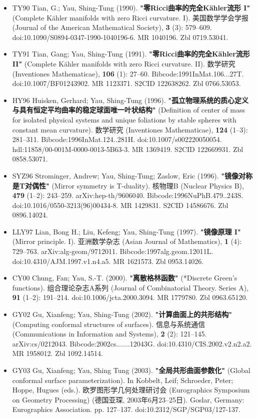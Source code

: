 \begin{itemize}
\item TY90 Tian, G.; Yau, Shing-Tung (1990). \textbf{"零Ricci曲率的完全Kähler流形 I"} (Complete Kähler manifolds with zero Ricci curvature. I). 美国数学学会学报 (Journal of the American Mathematical Society), \textbf{3} (3): 579–609. doi:10.1090/S0894-0347-1990-1040196-6. MR 1040196. Zbl 0719.53041.
\item TY91 Tian, Gang; Yau, Shing-Tung (1991). \textbf{"零Ricci曲率的完全Kähler流形 II"} (Complete Kähler manifolds with zero Ricci curvature. II). 数学研究 (Inventiones Mathematicae), \textbf{106} (1): 27–60. Bibcode:1991InMat.106...27T. doi:10.1007/BF01243902. MR 1123371. S2CID 122638262. Zbl 0766.53053.
\item HY96 Huisken, Gerhard; Yau, Shing-Tung (1996). \textbf{"孤立物理系统的质心定义与具有恒定平均曲率的稳定球面唯一叶状结构"} (Definition of center of mass for isolated physical systems and unique foliations by stable spheres with constant mean curvature). 数学研究 (Inventiones Mathematicae), \textbf{124} (1–3): 281–311. Bibcode:1996InMat.124..281H. doi:10.1007/s002220050054. hdl:11858/00-001M-0000-0013-5B63-3. MR 1369419. S2CID 122669931. Zbl 0858.53071.
\item SYZ96 Strominger, Andrew; Yau, Shing-Tung; Zaslow, Eric (1996). \textbf{"镜像对称是T对偶性"} (Mirror symmetry is T-duality). 核物理B (Nuclear Physics B), \textbf{479} (1–2): 243–259. arXiv:hep-th/9606040. Bibcode:1996NuPhB.479..243S. doi:10.1016/0550-3213(96)00434-8. MR 1429831. S2CID 14586676. Zbl 0896.14024.
\item LLY97 Lian, Bong H.; Liu, Kefeng; Yau, Shing-Tung (1997). \textbf{"镜像原理 I"} (Mirror principle. I). 亚洲数学杂志 (Asian Journal of Mathematics), \textbf{1} (4): 729–763. arXiv:alg-geom/9712011. Bibcode:1997alg.geom.12011L. doi:10.4310/AJM.1997.v1.n4.a5. MR 1621573. Zbl 0953.14026.
\item CY00 Chung, Fan; Yau, S.-T. (2000). \textbf{"离散格林函数"} (*Discrete Green's functions). 组合理论杂志A系列 (Journal of Combinatorial Theory. Series A), \textbf{91} (1–2): 191–214. doi:10.1006/jcta.2000.3094. MR 1779780. Zbl 0963.65120.
\item GY02 Gu, Xianfeng; Yau, Shing-Tung (2002). \textbf{"计算曲面上的共形结构"} (Computing conformal structures of surfaces). 信息与系统通信 (Communications in Information and Systems), \textbf{2} (2): 121–145. arXiv:cs/0212043. Bibcode:2002cs.......12043G. doi:10.4310/CIS.2002.v2.n2.a2. MR 1958012. Zbl 1092.14514.
\item GY03 Gu, Xianfeng; Yau, Shing Tung (2003). \textbf{"全局共形曲面参数化"} (Global conformal surface parameterization). In Kobbelt, Leif; Schroeder, Peter; Hoppe, Hugues (eds.). 欧罗图形学几何处理研讨会 (Eurographics Symposium on Geometry Processing) (德国亚琛, 2003年6月23–25日). Goslar, Germany: Eurographics Association. pp. 127–137. doi:10.2312/SGP/SGP03/127-137.

\end{itemize}

